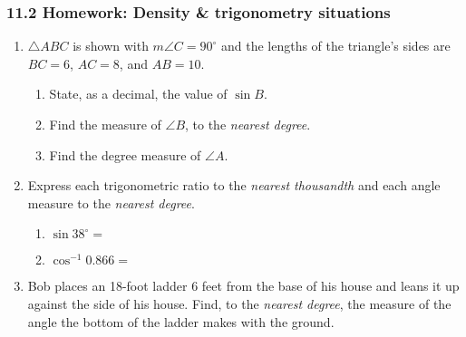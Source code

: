 \documentclass[12pt, twoside]{article}
\begin{document}
\subsubsection*{11.2 Homework: Density \& trigonometry situations}
 \begin{enumerate}

   \item $\triangle ABC$ is shown with $m\angle C=90^\circ$ and the lengths of the triangle's sides are $BC=6$, $AC=8$, and $AB=10$.
   \begin{multicols}{2}
         \begin{enumerate}
         \item State, as a decimal, the value of $\sin B$. \vspace{1.25cm}
         \item Find the measure of $\angle B$, to the \emph{nearest degree}. \vspace{1.25cm}
         \item Find the degree measure of $\angle A$.
       \end{enumerate}
     \end{multicols}
     \vspace{1.5cm}


   \item Express each trigonometric ratio to the \emph{nearest thousandth} and each angle measure to the \emph{nearest degree}.
     \begin{multicols}{2}
       \begin{enumerate}
         \item $\sin 38^\circ =$ \vspace{0.5cm}
         \item $\cos^{-1} 0.866 =$ \vspace{0.5cm}
       \end{enumerate}
     \end{multicols} \vspace{0.5cm}

   \item Bob places an 18-foot ladder 6 feet from the base of his house and leans it up against the side of his house. Find, to the \emph{nearest degree}, the measure of the angle the bottom of the ladder makes with the ground. \vspace{5cm}



\end{enumerate}
\end{document}
